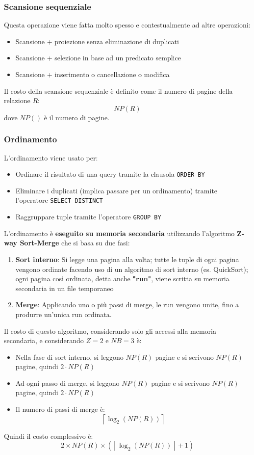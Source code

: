 \documentclass[a4paper,twoside]{article}
\begin{document}
\subsubsection{Scansione sequenziale}
Questa operazione viene fatta molto spesso e contestualmente ad altre operazioni:
\begin{itemize}
  \item Scansione + proiezione senza eliminazione di duplicati
  \item Scansione + selezione in base ad un predicato semplice
  \item Scansione + inserimento o cancellazione o modifica
\end{itemize}
Il costo della scansione sequenziale è definito come il numero di pagine della
relazione \( R \):
\[
  NP(R)
\] 
dove \( NP() \) è il numero di pagine.

\subsubsection{Ordinamento}
L'ordinamento viene usato per:
\begin{itemize}
  \item Ordinare il risultato di una query tramite la clausola \texttt{ORDER BY}
  \item Eliminare i duplicati (implica passare per un ordinamento) tramite
    l'operatore \texttt{SELECT DISTINCT}
  \item Raggruppare tuple tramite l'operatore \texttt{GROUP BY}
\end{itemize}
L'ordinamento è \textbf{eseguito su memoria secondaria} utilizzando l'algoritmo
\textbf{Z-way Sort-Merge} che si basa su due fasi:
\begin{enumerate}
  \item \textbf{Sort interno}: Si legge una pagina alla volta; tutte le tuple di ogni
    pagina vengono ordinate facendo uso di un algoritmo di sort interno
    (es. QuickSort); ogni pagina così ordinata, detta anche \textbf{"run"}, viene
    scritta su memoria secondaria in un file temporaneo

  \item \textbf{Merge}: Applicando uno o più passi di merge, le run vengono unite,
    fino a produrre un'unica run ordinata.
\end{enumerate}
Il costo di questo algoritmo, considerando solo gli accessi alla memoria secondaria,
e considerando \( Z = 2 \) e \( NB = 3 \) è:
\begin{itemize}
  \item Nella fase di sort interno, si leggono \( NP(R) \) pagine e si scrivono
    \( NP(R) \) pagine, quindi \( 2 \cdot NP(R) \)
  \item Ad ogni passo di merge, si leggono \( NP(R) \) pagine e si scrivono \( NP(R) \)
    pagine, quindi \( 2 \cdot NP(R) \)
  \item Il numero di passi di merge è:
    \[
      \left\lceil \log_2(NP(R)) \right\rceil 
    \] 
\end{itemize}
Quindi il costo complessivo è:
\[
  2 \times NP(R) \times \left( \left\lceil \log_2(NP(R)) \right\rceil + 1 \right) 
\] 
\end{document}
